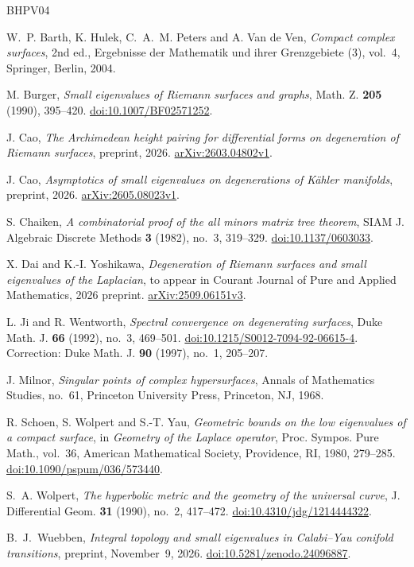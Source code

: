 \documentclass[11pt]{amsart}
\theoremstyle{definition}
\theoremstyle{remark}
\begin{document}
\begin{thebibliography}{BHPV04}

W.~P. Barth, K. Hulek, C.~A.~M. Peters and A. Van de Ven,
\emph{Compact complex surfaces}, 2nd ed.,
Ergebnisse der Mathematik und ihrer Grenzgebiete (3), vol.~4,
Springer, Berlin, 2004.

M. Burger,
\emph{Small eigenvalues of Riemann surfaces and graphs},
Math. Z. \textbf{205} (1990), 395--420.
\href{https://doi.org/10.1007/BF02571252}{doi:10.1007/BF02571252}.

J. Cao,
\emph{The Archimedean height pairing for differential forms on degeneration of
Riemann surfaces},
preprint, 2026.
\href{https://arxiv.org/abs/2603.04802v1}{arXiv:2603.04802v1}.

J. Cao,
\emph{Asymptotics of small eigenvalues on degenerations of K\"ahler manifolds},
preprint, 2026.
\href{https://arxiv.org/abs/2605.08023v1}{arXiv:2605.08023v1}.

S. Chaiken,
\emph{A combinatorial proof of the all minors matrix tree theorem},
SIAM J. Algebraic Discrete Methods \textbf{3} (1982), no.~3, 319--329.
\href{https://doi.org/10.1137/0603033}{doi:10.1137/0603033}.

X. Dai and K.-I. Yoshikawa,
\emph{Degeneration of Riemann surfaces and small eigenvalues of the Laplacian},
to appear in Courant Journal of Pure and Applied Mathematics, 2026 preprint.
\href{https://arxiv.org/abs/2509.06151v3}{arXiv:2509.06151v3}.

L. Ji and R. Wentworth,
\emph{Spectral convergence on degenerating surfaces},
Duke Math. J. \textbf{66} (1992), no.~3, 469--501.
\href{https://doi.org/10.1215/S0012-7094-92-06615-4}{doi:10.1215/S0012-7094-92-06615-4}.
Correction: Duke Math. J. \textbf{90} (1997), no.~1, 205--207.

J. Milnor,
\emph{Singular points of complex hypersurfaces},
Annals of Mathematics Studies, no.~61,
Princeton University Press, Princeton, NJ, 1968.

R. Schoen, S. Wolpert and S.-T. Yau,
\emph{Geometric bounds on the low eigenvalues of a compact surface},
in \emph{Geometry of the Laplace operator},
Proc. Sympos. Pure Math., vol.~36,
American Mathematical Society, Providence, RI, 1980, 279--285.
\href{https://doi.org/10.1090/pspum/036/573440}{doi:10.1090/pspum/036/573440}.

S.~A. Wolpert,
\emph{The hyperbolic metric and the geometry of the universal curve},
J. Differential Geom. \textbf{31} (1990), no.~2, 417--472.
\href{https://doi.org/10.4310/jdg/1214444322}{doi:10.4310/jdg/1214444322}.

B.~J.~Wuebben,
\emph{Integral topology and small eigenvalues in Calabi--Yau conifold
transitions},
preprint, November~9, 2026.
\href{https://doi.org/10.5281/zenodo.24096887}{doi:10.5281/zenodo.24096887}.

\end{thebibliography}
\end{document}
